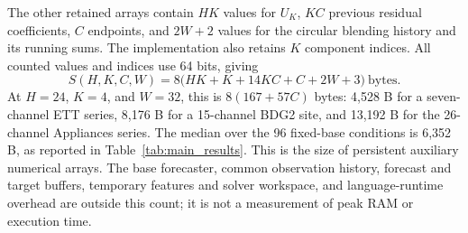 The other retained arrays contain $HK$ values for $U_K$, $KC$ previous residual coefficients, $C$ endpoints, and $2W+2$ values for the circular blending history and its running sums. The implementation also retains $K$ component indices. All counted values and indices use 64 bits, giving
\begin{equation}
 S(H,K,C,W)=8\bigl(HK+K+14KC+C+2W+3\bigr)
 \ \text{bytes}.
 \label{eq:state_bytes}
\end{equation}
At $H=24$, $K=4$, and $W=32$, this is $8(167+57C)$ bytes: 4,528 B for a seven-channel ETT series, 8,176 B for a 15-channel BDG2 site, and 13,192 B for the 26-channel Appliances series. The median over the 96 fixed-base conditions is 6,352 B, as reported in Table~\ref{tab:main_results}. This is the size of persistent auxiliary numerical arrays. The base forecaster, common observation history, forecast and target buffers, temporary features and solver workspace, and language-runtime overhead are outside this count; it is not a measurement of peak RAM or execution time.
